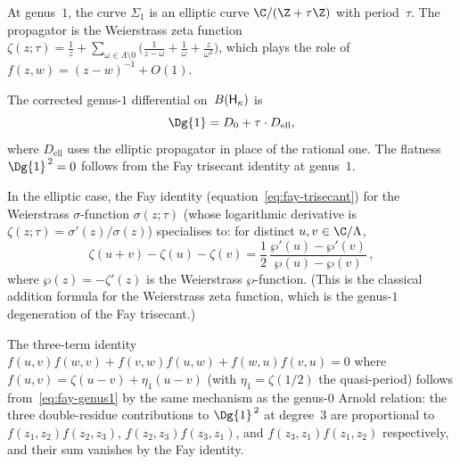 \begin{verification}
\label{ver:heis-genus-1}
At genus~$1$, the curve $\Sigma_1$ is an elliptic curve
$\C / (\Z + \tau\Z)$ with period~$\tau$. The propagator
is the Weierstrass zeta function
$\zeta(z; \tau) = \frac{1}{z}
+ \sum_{\omega \in \Lambda \setminus 0}
\bigl(\frac{1}{z - \omega} + \frac{1}{\omega}
+ \frac{z}{\omega^2}\bigr)$,
which plays the role of $f(z,w) = (z-w)^{-1} + O(1)$.

The corrected genus-$1$ differential on~$B(\mathsf{H}_\kappa)$ is
\[
 \Dg{1} = D_0 + \tau \cdot D_{\mathrm{ell}},
\]
where $D_{\mathrm{ell}}$ uses the elliptic propagator in place
of the rational one. The flatness $\Dg{1}^{\,2} = 0$ follows
from the Fay trisecant identity at genus~$1$.

In the elliptic case, the Fay identity
(equation~\eqref{eq:fay-trisecant}) for
the Weierstrass $\sigma$-function
$\sigma(z;\tau)$ (whose logarithmic derivative is
$\zeta(z;\tau) = \sigma'(z)/\sigma(z)$) specialises to:
for distinct $u, v \in \C / \Lambda$,
\begin{equation}\label{eq:fay-genus1}
 \zeta(u + v) - \zeta(u) - \zeta(v)
 = \frac{1}{2}\,
 \frac{\wp'(u) - \wp'(v)}{\wp(u) - \wp(v)}\,,
\end{equation}
where $\wp(z) = -\zeta'(z)$ is the Weierstrass $\wp$-function.
(This is the classical addition formula for the Weierstrass
zeta function, which is the genus-$1$ degeneration of the
Fay trisecant.)

The three-term identity
$f(u,v) f(w,v) + f(v,w) f(u,w) + f(w,u) f(v,u) = 0$
where $f(u,v) = \zeta(u-v) + \eta_1(u - v)$
(with $\eta_1 = \zeta(1/2)$ the quasi-period) follows
from~\eqref{eq:fay-genus1} by the same mechanism as the
genus-$0$ Arnold relation: the three double-residue
contributions to $\Dg{1}^{\,2}$ at degree~$3$ are
proportional to $f(z_1,z_2) f(z_2,z_3)$,
$f(z_2,z_3) f(z_3,z_1)$, and $f(z_3,z_1) f(z_1,z_2)$
respectively, and their sum vanishes by the Fay identity.
\end{verification}

